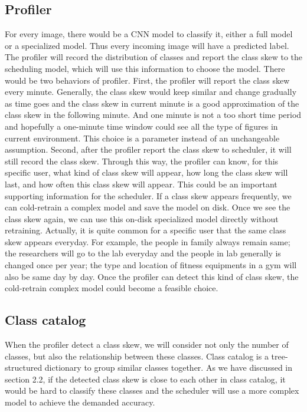 \documentclass[conference]{IEEEtran}
\begin{document}
\begin{spacing}{0.9}
\subsection{Profiler}
For every image, there would be a CNN model to classify it, either a full model or a specialized model. Thus every incoming image will have a predicted label. The profiler will record the distribution of classes and report the class skew to the scheduling model, which will use this information to choose the model. There would be two behaviors of profiler. First, the profiler will report the class skew every minute. Generally, the class skew would keep similar and change gradually as time goes and the class skew in current minute is a good approximation of the class skew in the following minute. And one minute is not a too short time period and hopefully a one-minute time window could see all the type of figures in current environment. This choice is a parameter instead of an unchangeable assumption. Second, after the profiler report the class skew to scheduler, it will still record the class skew. Through this way, the profiler can know, for this specific user, what kind of class skew will appear, how long the class skew will last, and how often this class skew will appear. This could be an important supporting information for the scheduler. If a class skew appears frequently, we can cold-retrain a complex model and save the model on disk. Once we see the class skew again, we can use this on-disk specialized model directly without retraining. Actually, it is quite common for a specific user that the same class skew appears everyday. For example, the people in family always remain same; the researchers will go to the lab everyday and the people in lab generally is changed once per year; the type and location of fitness equipments in a gym will also be same day by day. Once the profiler can detect this kind of class skew, the cold-retrain complex model could become a feasible choice.

\subsection{Class catalog}
When the profiler detect a class skew, we will consider not only the number of classes, but also the relationship between these classes. Class catalog is a tree-structured dictionary to group similar classes together. As we have discussed in section 2.2, if the detected class skew is close to each other in class catalog, it would be hard to classify these classes and the scheduler will use a more complex model to achieve the demanded accuracy. 



\end{spacing}
\end{document}
